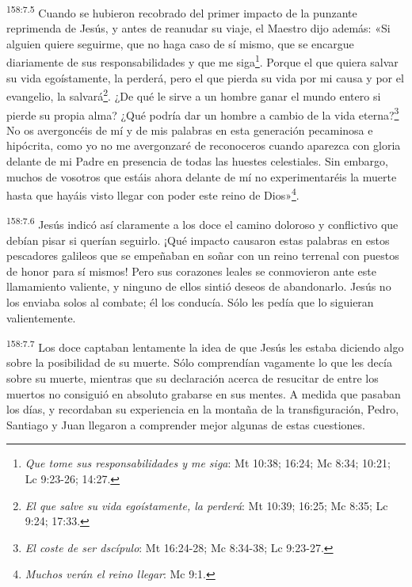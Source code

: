 \par
\textsuperscript{158:7.5} Cuando se hubieron recobrado del primer impacto de la punzante reprimenda de Jesús, y antes de reanudar su viaje, el Maestro dijo además: «Si alguien quiere seguirme, que no haga caso de sí mismo, que se encargue diariamente de sus responsabilidades y que me siga\footnote{\textit{Que tome sus responsabilidades y me siga}: Mt 10:38; 16:24; Mc 8:34; 10:21; Lc 9:23-26; 14:27.}. Porque el que quiera salvar su vida egoístamente, la perderá, pero el que pierda su vida por mi causa y por el evangelio, la salvará\footnote{\textit{El que salve su vida egoístamente, la perderá}: Mt 10:39; 16:25; Mc 8:35; Lc 9:24; 17:33.}. ¿De qué le sirve a un hombre ganar el mundo entero si pierde su propia alma? ¿Qué podría dar un hombre a cambio de la vida eterna?\footnote{\textit{El coste de ser dscípulo}: Mt 16:24-28; Mc 8:34-38; Lc 9:23-27.} No os avergoncéis de mí y de mis palabras en esta generación pecaminosa e hipócrita, como yo no me avergonzaré de reconoceros cuando aparezca con gloria delante de mi Padre en presencia de todas las huestes celestiales. Sin embargo, muchos de vosotros que estáis ahora delante de mí no experimentaréis la muerte hasta que hayáis visto llegar con poder este reino de Dios»\footnote{\textit{Muchos verán el reino llegar}: Mc 9:1.}.

\par
\textsuperscript{158:7.6} Jesús indicó así claramente a los doce el camino doloroso y conflictivo que debían pisar si querían seguirlo. ¡Qué impacto causaron estas palabras en estos pescadores galileos que se empeñaban en soñar con un reino terrenal con puestos de honor para sí mismos! Pero sus corazones leales se conmovieron ante este llamamiento valiente, y ninguno de ellos sintió deseos de abandonarlo. Jesús no los enviaba solos al combate; él los conducía. Sólo les pedía que lo siguieran valientemente.

\par
\textsuperscript{158:7.7} Los doce captaban lentamente la idea de que Jesús les estaba diciendo algo sobre la posibilidad de su muerte. Sólo comprendían vagamente lo que les decía sobre su muerte, mientras que su declaración acerca de resucitar de entre los muertos no consiguió en absoluto grabarse en sus mentes. A medida que pasaban los días, y recordaban su experiencia en la montaña de la transfiguración, Pedro, Santiago y Juan llegaron a comprender mejor algunas de estas cuestiones.

